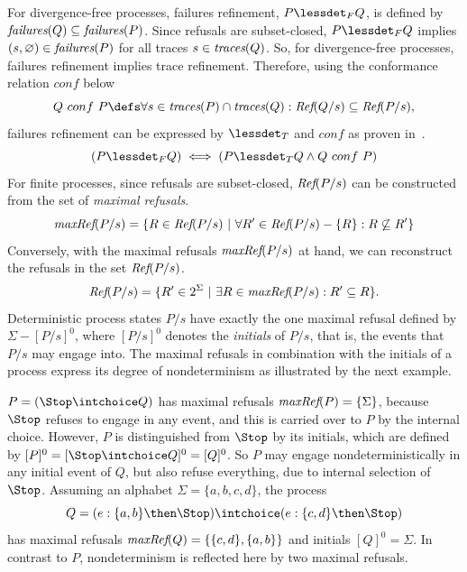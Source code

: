 For divergence-free processes, failures refinement, $P \lessdet_F Q$, is
defined by $\text{\it failures}(Q)\subseteq\text{\it failures}(P)$. Since refusals are subset-closed,
$P \lessdet_F Q$ implies $(s,\varnothing)\in\text{\it failures}(P)$ for all traces
$s\in\text{\it traces}(Q)$. So, for divergence-free processes, failures refinement implies
trace refinement. Therefore, using the conformance relation $conf$ below
%
\begin{equation}\label{eq:conf}
  Q\ conf\ P \defs \forall s\in \trc(P) \cap \trc(Q): \refs(Q/s)
  \subseteq \refs(P/s),
\end{equation}
%
failures refinement can be expressed by $\lessdet_T$ and $conf$ as proven
in~\cite{DBLP:conf/icfem/CavalcantiG07}.
%
\begin{equation}%
\label{eq:failconf}
(P \lessdet_F Q) \iff (P \lessdet_T Q \land Q\ conf\ P)
\end{equation}
%
For finite processes, since refusals are subset-closed, $\text{\it Ref}(P/s)$ can be
constructed from the set of \emph{maximal refusals}.
%
\begin{equation}
\text{\it maxRef}(P/s) = \{ R \in\text{\it Ref}(P/s)~|~\forall R'\in \text{\it Ref}(P/s) - \{ R\}: R \not\subseteq R'\}
\end{equation}
%
Conversely, with the maximal refusals $\text{\it maxRef}(P/s)$ at hand, we can
reconstruct the refusals in the set $\text{\it Ref}(P/s)$. %
%
\begin{equation}\label{eq:refMaxRef}
\text{\it Ref}(P/s) = \{ R'\in 2^\Sigma~|~\exists R\in \text{\it maxRef}(P/s): R'\subseteq R \}.
\end{equation}
%
Deterministic process states $P/s$ have exactly the one maximal refusal
defined by $\Sigma-[P/s]^0$, where $[P/s]^0$ denotes the \emph{initials} of
$P/s$, that is, the events that $P/s$ may engage into. The maximal refusals
in combination with the initials of a process express its degree of
nondeterminism as illustrated by the next example.
%
\begin{example}
\label{ex:nondetdegree} $P = (\Stop \intchoice Q)$ has maximal refusals
$\text{\it maxRef}(P) = \{ \Sigma \}$, because $\Stop$ refuses to engage in any event,
and this is carried over to $P$ by the internal choice. However, $P$ is
distinguished from $\Stop$ by its initials, which are defined by $[P]^0 = [
\Stop \intchoice Q]^0 = [Q]^0$. So $P$ may engage nondeterministically in any
initial event of $Q$, but also refuse everything, due to internal selection
of $\Stop$. Assuming an alphabet $\Sigma = \{a,b,c,d\}$, the process
%
$$Q = (e:\{a,b\} \then \Stop) \intchoice (e:\{c,d\} \then \Stop)$$
%
has maximal refusals $\text{\it maxRef}(Q) = \{ \{c,d\}, \{a,b\} \}$ and initials
$[Q]^0=\Sigma$. In contrast to $P$, nondeterminism is reflected here by
two maximal refusals. \xbox
\end{example}

